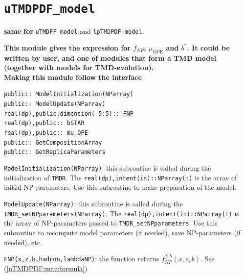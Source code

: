 \documentclass[prd,nofootinbib,eqsecnum,final]{revtex4}
\renewcommand{\(}{\left(}
\renewcommand{\)}{\right)}
\renewcommand{\[}{\left[}
\renewcommand{\]}{\right]}
\newcommand{\blue}[1]{{\color{blue} #1}}
\begin{document}
\newpage
\section{\texttt{uTMDPDF\_model}}
\begin{center}
\blue{\textbf{same for}} \texttt{uTMDFF\_model} and \texttt{lpTMDPDF\_model}.
\end{center}

\begin{tcolorbox}
\begin{center}
\textbf{This module gives the expression for $f_{NP}$, $\mu_{\text{OPE}}$ and $b^*$. It could be written by user, and one of modules that form a TMD model (together with models for TMD-evolution).}
\\
\textbf{\blue{Making this module follow the interface}}
\end{center}
\texttt{public:: ModelInitialization(NParray)}
\\
\texttt{public:: ModelUpdate(NParray)}
\\
\texttt{real(dp),public,dimension(-5:5):: FNP}
\\
\texttt{real(dp),public:: bSTAR}
\\
\texttt{real(dp),public:: mu\_OPE}
\\
\texttt{public:: GetCompositionArray}
\\
\texttt{public:: GetReplicaParameters}
\end{tcolorbox}

\texttt{ModelInitialization(NParray)}: this subroutine is called during the initialization of \texttt{TMDR}. The \texttt{real(dp),intent(in)::NParray(:)} is the array of initial NP-parameters. Use this subroutine to make preparation of the model.

\vspace{2mm}

\texttt{ModelUpdate(NParray)}: this subroutine is called during the \texttt{TMDR\_setNPparameters(NParray)}. The \texttt{real(dp),intent(in)::NParray(:)} is the array of NP-parameters passed to \texttt{TMDR\_setNPparameters}. Use this subroutine to recompute model parameters (if needed), save NP-parameters (if needed), etc.

\vspace{2mm}

\texttt{FNP(x,z,b,hadron,lambdaNP)}: the function returns $f^{f,h}_{NP}(x,z,b)$. See (\ref{uTMDPDF:mainformula})

\vspace{2mm}
\end{document}
